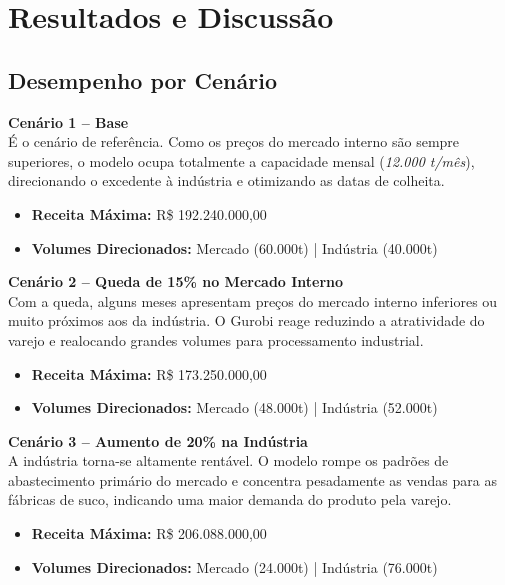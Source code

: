 \documentclass[12pt, a4paper]{article}
\begin{document}
\section{Resultados e Discussão}

\subsection{Desempenho por Cenário}

\textbf{Cenário 1 – Base} \\
É o cenário de referência. Como os preços do mercado interno são sempre superiores, o modelo ocupa totalmente a capacidade mensal (\textit{12.000 t/mês}), direcionando o excedente à indústria e otimizando as datas de colheita.
\begin{itemize}
    \item \textbf{Receita Máxima:} R\$ 192.240.000,00
    \item \textbf{Volumes Direcionados:} Mercado (60.000t) | Indústria (40.000t)
\end{itemize}

\vspace{0.2cm}\noindent\textbf{Cenário 2 – Queda de 15\% no Mercado Interno} \\
Com a queda, alguns meses apresentam preços do mercado interno inferiores ou muito próximos aos da indústria. O Gurobi reage reduzindo a atratividade do varejo e realocando grandes volumes para processamento industrial.
\begin{itemize}
    \item \textbf{Receita Máxima:} R\$ 173.250.000,00
    \item \textbf{Volumes Direcionados:} Mercado (48.000t) | Indústria (52.000t)
\end{itemize}

\vspace{0.2cm}\noindent\textbf{Cenário 3 – Aumento de 20\% na Indústria} \\
A indústria torna-se altamente rentável. O modelo rompe os padrões de abastecimento primário do mercado e concentra pesadamente as vendas para as fábricas de suco, indicando uma maior demanda do produto pela varejo.
\begin{itemize}
    \item \textbf{Receita Máxima:} R\$ 206.088.000,00
    \item \textbf{Volumes Direcionados:} Mercado (24.000t) | Indústria (76.000t)
\end{itemize}
\end{document}
